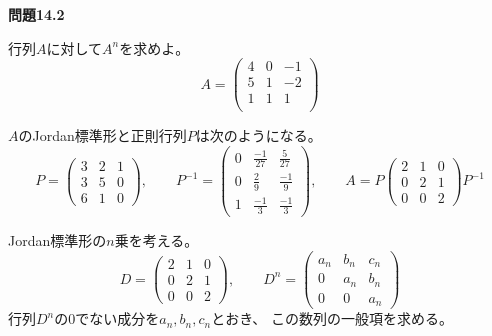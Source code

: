 \documentclass[12pt,b5paper]{ltjsarticle}
\begin{document}
%
%
%
%
%





\hrulefill

\textbf{問題14.2}

行列$A$に対して$A^n$を求めよ。
\begin{equation}
 A=
  \begin{pmatrix}
   4 & 0 & -1 \\
   5 & 1 & -2 \\
   1 & 1 & 1 \\
  \end{pmatrix}
\end{equation}

\dotfill

$A$のJordan標準形と正則行列$P$は次のようになる。
\begin{equation}
 P=
  \begin{pmatrix}
   3 & 2 & 1 \\
   3 & 5 & 0 \\
   6 & 1 & 0
  \end{pmatrix}
  ,\qquad
  P^{-1}=
  \begin{pmatrix}
   0 & \frac{-1}{27} & \frac{5}{27} \\
   0 & \frac{2}{9} & \frac{-1}{9} \\
   1 & \frac{-1}{3} & \frac{-1}{3}
  \end{pmatrix}
  ,\qquad
  A=P
  \begin{pmatrix}
   2 & 1 & 0 \\
   0 & 2 & 1 \\
   0 & 0 & 2
  \end{pmatrix}
  P^{-1}
\end{equation}

Jordan標準形の$n$乗を考える。
\begin{equation}
 D=
  \begin{pmatrix}
   2 & 1 & 0 \\
   0 & 2 & 1 \\
   0 & 0 & 2
  \end{pmatrix}
  ,\qquad
 D^n=
  \begin{pmatrix}
   a_n & b_n & c_n \\
   0 & a_n & b_n \\
   0 & 0 & a_n
  \end{pmatrix}
\end{equation}
行列$D^n$の$0$でない成分を$a_n,b_n,c_n$とおき、
この数列の一般項を求める。
\end{document}
